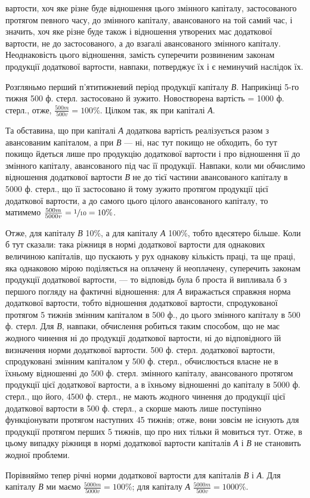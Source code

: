 \parcont{}  %
вартости, хоч яке різне буде відношення цього змінного капіталу, застосованого
протягом певного часу, до змінного капіталу, авансованого на
той самий час, і значить, хоч яке різне буде також і відношення утворених
мас додаткової вартости, не до застосованого, а до взагалі авансованого
змінного капіталу. Неоднаковість цього відношення, замість суперечити
розвиненим законам продукції додаткової вартости, навпаки,
потверджує їх і є неминучий наслідок їх.

Розгляньмо перший п’ятитижневий період продукції капіталу \emph{В}. Наприкінці
5-го тижня 500 ф. стерл. застосовано й зужито. Новостворена
вартість = 1000 ф. стерл., отже, $\frac{500m}{500v}=100\%$. Цілком так, як при капіталі \emph{А}.

Та обставина, що при капіталі \emph{А} додаткова вартість реалізується разом з
авансованим капіталом, а при \emph{В} — ні, нас тут покищо не обходить, бо
тут покищо йдеться лише про продукцію додаткової вартости і про
відношення її до змінного капіталу, авансованого під час її продукції.
Навпаки, коли ми обчислимо відношення додаткової вартости \emph{В} не
до тієї частини авансованого капіталу в 5000 ф. стерл., що її застосовано й
тому зужито протягом продукції цієї додаткової вартости, а до самого
цього цілого авансованого капіталу, то матимемо $\frac{500m}{5000v} = \sfrac{1}{10} = 10\%$.

Отже, для капіталу \emph{В} 10\%, а для капіталу \emph{А} 100\%, тобто вдесятеро
більше. Коли б тут сказали: така ріжниця в нормі додаткової вартости
для однакових величиною капіталів, що пускають у рух однакову кількість
праці, та ще праці, яка однаковою мірою поділяється на оплачену й
неоплачену, суперечить законам продукції додаткової вартости, — то
відповідь була б проста й випливала б з першого погляду на фактичні
відношення: для \emph{А} виражається справжня норма додаткової вартости,
тобто відношення додаткової вартости, спродукованої протягом 5 тижнів
змінним капіталом в 500 ф., до цього змінного капіталу в 500 ф. стерл.
Для \emph{В}, навпаки, обчислення робиться таким способом, що не має жодного
чинення ні до продукції додаткової вартости, ні до відповідного їй
визначення норми додаткової вартости. 500 ф. стерл. додаткової вартости,
спродуковані змінним капіталом у 500 ф. стерл., обчислюється
власне не в їхньому відношенні до 500 ф. стерл. змінного капіталу, авансованого
протягом продукції цієї додаткової вартости, а в їхньому відношенні
до капіталу в 5000 ф. стерл., що  його, 4500 ф. стерл., не мають
жодного чинення до продукції цієї додаткової вартости в 500 ф. стерл., а
скорше мають лише поступінно функціонувати протягом наступних 45 тижнів;
отже, вони зовсім не існують для продукції протягом перших 5 тижнів,
що про них тільки й мовиться тут. Отже, в цьому випадку ріжниця
в нормі додаткової вартости капіталів \emph{А} і \emph{В} не становить жодної
проблеми.

Порівняймо тепер річні норми додаткової вартости для капіталів \emph{В} і \emph{А}.
Для капіталу \emph{В} ми маємо $\frac{5000m}{5000v} = 100\%$;
для капіталу \emph{А} $\frac{5000m}{500v} = 1000\%$.
\parbreak{}  %
